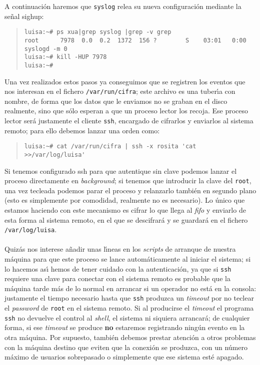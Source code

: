 A continuaci\'on haremos que {\tt syslog} relea su nueva configuraci\'on 
mediante la se\~nal {\sc sighup}:
\begin{quote}
\begin{verbatim}
luisa:~# ps xua|grep syslog |grep -v grep
root      7978  0.0  0.2  1372  156 ?        S    03:01   0:00 syslogd -m 0
luisa:~# kill -HUP 7978
luisa:~#
\end{verbatim}
\end{quote}
Una vez realizados estos pasos ya conseguimos que se registren los eventos
que nos interesan en el fichero {\tt /var/run/cifra}; este archivo es una 
tuber\'{\i}a con nombre, de forma que los datos que le enviamos no se graban en 
el disco realmente, sino que s\'olo esperan a que un proceso lector los
recoja. Ese proceso lector ser\'a justamente el cliente {\tt ssh}, encargado
de cifrarlos y enviarlos al sistema remoto; para ello debemos lanzar una orden
como:
\begin{quote}
\begin{verbatim}
luisa:~# cat /var/run/cifra | ssh -x rosita 'cat >>/var/log/luisa'
\end{verbatim}
\end{quote}
Si tenemos configurado {\sc ssh} para que autentique sin clave podemos lanzar
el proceso directamente en {\it background}; si tenemos que introducir la
clave del {\tt root}, una vez tecleada podemos parar el proceso y relanzarlo 
tambi\'en en segundo plano (esto es simplemente por comodidad, realmente no
es necesario). Lo \'unico que estamos haciendo con este mecanismo es cifrar lo 
que llega al {\it 
fifo} y enviarlo de esta forma al sistema remoto, en el que se descifrar\'a y
se guardar\'a en el fichero {\tt /var/log/luisa}.\\
\\Quiz\'as nos interese a\~nadir unas l\'{\i}neas en los {\it scripts} de 
arranque de nuestra m\'aquina para que este proceso se lance autom\'aticamente
al iniciar el sistema; si lo hacemos as\'{\i} hemos de tener cuidado con la
autenticaci\'on, ya que si {\tt ssh} requiere una clave para conectar con el
sistema remoto es probable que la m\'aquina tarde m\'as de lo normal en arrancar
si un operador no est\'a en la consola: justamente el tiempo necesario
hasta que {\tt ssh} produzca un {\it timeout} por no teclear el {\it password}
de {\tt root} en el sistema remoto. Si al producirse el {\it timeout} el
programa {\tt ssh} no devuelve el control al {\it shell}, el sistema ni siquiera
arrancar\'a; de cualquier forma, si ese {\it timeout} se produce {\bf no}
estaremos registrando ning\'un evento en la otra m\'aquina. Por supuesto,
tambi\'en debemos prestar atenci\'on a otros problemas con la m\'aquina destino
que eviten que la conexi\'on se produzca, con un n\'umero m\'aximo de usuarios
sobrepasado o simplemente que ese sistema est\'e apagado.
